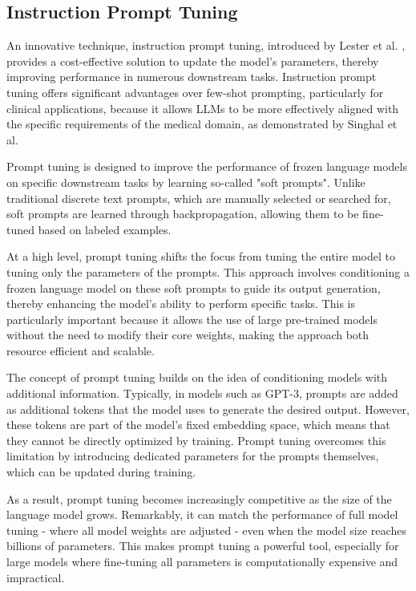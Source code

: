 \subsection{Instruction Prompt Tuning}


An innovative technique, instruction prompt tuning, introduced by Lester et al. \cite{lester2021power}, provides a cost-effective solution to update the model's parameters, thereby improving performance in numerous downstream tasks. Instruction prompt tuning offers significant advantages over few-shot prompting, particularly for clinical applications, because it allows LLMs to be more effectively aligned with the specific requirements of the medical domain, as demonstrated by Singhal et al. \cite{singhal2022large}

Prompt tuning is designed to improve the performance of frozen language models on specific downstream tasks by learning so-called "soft prompts". Unlike traditional discrete text prompts, which are manually selected or searched for, soft prompts are learned through backpropagation, allowing them to be fine-tuned based on labeled examples.

At a high level, prompt tuning shifts the focus from tuning the entire model to tuning only the parameters of the prompts. This approach involves conditioning a frozen language model on these soft prompts to guide its output generation, thereby enhancing the model's ability to perform specific tasks. This is particularly important because it allows the use of large pre-trained models without the need to modify their core weights, making the approach both resource efficient and scalable.

The concept of prompt tuning builds on the idea of conditioning models with additional information. Typically, in models such as GPT-3, prompts are added as additional tokens that the model uses to generate the desired output. However, these tokens are part of the model's fixed embedding space, which means that they cannot be directly optimized by training. Prompt tuning overcomes this limitation by introducing dedicated parameters for the prompts themselves, which can be updated during training.

As a result, prompt tuning becomes increasingly competitive as the size of the language model grows. Remarkably, it can match the performance of full model tuning - where all model weights are adjusted - even when the model size reaches billions of parameters. This makes prompt tuning a powerful tool, especially for large models where fine-tuning all parameters is computationally expensive and impractical.

